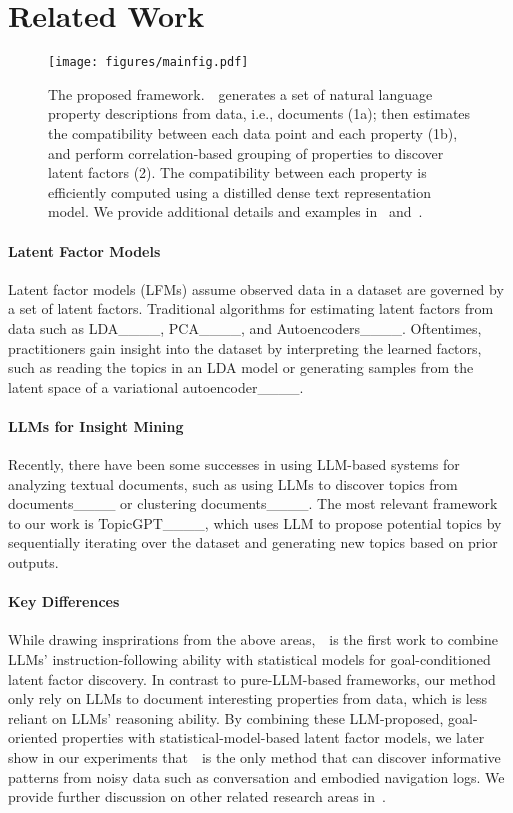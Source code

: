 \section{Related Work}
\begin{figure*}[tb]
\centering
\texttt{[image: figures/mainfig.pdf]}
\caption{The proposed framework.~\ourmethod~generates a set of natural language property descriptions from data, i.e., documents (1a); then estimates the compatibility between each data point and each property (1b), and perform correlation-based grouping of properties to discover latent factors (2). The compatibility between each property is efficiently computed using a distilled dense text representation model. We provide additional details and examples in~ and~.
}
\label{fig:our_framework}
\vspace{-2mm}
\end{figure*}




\paragraph{Latent Factor Models}
Latent factor models (LFMs) assume observed data in a dataset are governed by a set of latent factors. 
Traditional algorithms for estimating latent factors from data such as LDA____, PCA____, and Autoencoders____. 
Oftentimes, practitioners gain insight into the dataset by interpreting the learned factors, such as reading the topics in an LDA model or generating samples from the latent space of a variational autoencoder____.


\paragraph{LLMs for Insight Mining}
Recently, there have been some successes in using LLM-based systems for analyzing textual documents, such as using LLMs to discover topics from documents____ or clustering documents____.
The most relevant framework to our work is TopicGPT____, which uses LLM to propose potential topics by sequentially iterating over the dataset and generating new topics based on prior outputs.


\paragraph{Key Differences} While drawing insprirations from the above areas,~\ourmethod~is the first work to combine LLMs' instruction-following ability with statistical models for goal-conditioned latent factor discovery.
In contrast to pure-LLM-based frameworks, our method only rely on LLMs to document interesting properties from data, which is less reliant on LLMs' reasoning ability.
By combining these LLM-proposed, goal-oriented properties with statistical-model-based latent factor models, we later show in our experiments that~\ourmethod~is the only method that can discover informative patterns from noisy data such as conversation and embodied navigation logs.
We provide further discussion on other related research areas in~.